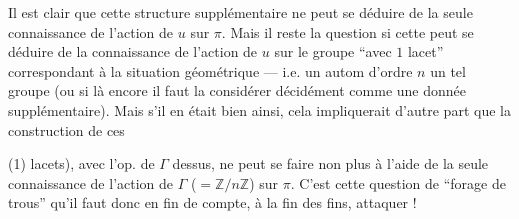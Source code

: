 Il est clair que cette structure supplémentaire ne peut se déduire
de la seule connaissance de l'action de \(u\) sur \(\pi\).
Mais il reste la question si cette 
peut se déduire de la connaissance de l'action
 de \(u\) sur le groupe
``avec \(1\) lacet'' correspondant à la situation géométrique
--- i.e. un autom 
 d'ordre \(n\)  un tel groupe
(ou si là encore il faut la considérer décidément comme une donnée
supplémentaire).
Mais s'il en était bien ainsi, cela impliquerait d'autre part que la
construction de ces 



(1) lacets), avec l'op. de \(\Gamma\) dessus, ne peut se faire non
plus à l'aide de la seule 
connaissance de l'action de \(\Gamma\) (\(=\mathbb Z/n\mathbb Z\))
sur \(\pi\).
C'est cette question de ``forage de trous'' qu'il faut donc en fin de
compte, à la fin des fins, attaquer !

